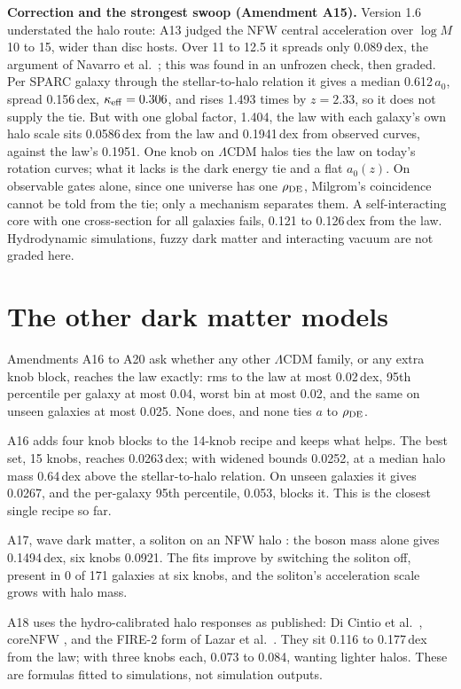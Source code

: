 \documentclass[11pt]{article}
\begin{document}
\textbf{Correction and the strongest swoop (Amendment A15).} Version 1.6 understated the halo route: A13 judged the NFW central acceleration over $\log M$ 10 to 15, wider than disc hosts. Over 11 to 12.5 it spreads only 0.089\,dex, the argument of Navarro et al.\ \cite{navarro17}; this was found in an unfrozen check, then graded. Per SPARC galaxy through the stellar-to-halo relation it gives a median 0.612\,$a_0$, spread 0.156\,dex, $\kappa_{\rm eff}=0.306$, and rises 1.493 times by $z=2.33$, so it does not supply the tie. But with one global factor, 1.404, the law with each galaxy's own halo scale sits 0.0586\,dex from the law and 0.1941\,dex from observed curves, against the law's 0.1951. One knob on $\Lambda$CDM halos ties the law on today's rotation curves; what it lacks is the dark energy tie and a flat $a_0(z)$. On observable gates alone, since one universe has one $\rho_{\rm DE}$, Milgrom's coincidence cannot be told from the tie; only a mechanism separates them. A self-interacting core with one cross-section for all galaxies \cite{kaplinghat14} fails, 0.121 to 0.126\,dex from the law. Hydrodynamic simulations, fuzzy dark matter and interacting vacuum are not graded here.

\section{The other dark matter models}
Amendments A16 to A20 ask whether any other $\Lambda$CDM family, or any extra knob block, reaches the law exactly: rms to the law at most 0.02\,dex, 95th percentile per galaxy at most 0.04, worst bin at most 0.02, and the same on unseen galaxies at most 0.025. None does, and none ties $a$ to $\rho_{\rm DE}$.

A16 adds four knob blocks to the 14-knob recipe and keeps what helps. The best set, 15 knobs, reaches 0.0263\,dex; with widened bounds 0.0252, at a median halo mass 0.64\,dex above the stellar-to-halo relation. On unseen galaxies it gives 0.0267, and the per-galaxy 95th percentile, 0.053, blocks it. This is the closest single recipe so far.

A17, wave dark matter, a soliton on an NFW halo \cite{schive14}: the boson mass alone gives 0.1494\,dex, six knobs 0.0921. The fits improve by switching the soliton off, present in 0 of 171 galaxies at six knobs, and the soliton's acceleration scale grows with halo mass.

A18 uses the hydro-calibrated halo responses as published: Di Cintio et al.\ \cite{dicintio14}, coreNFW \cite{read16}, and the FIRE-2 form of Lazar et al.\ \cite{lazar20}. They sit 0.116 to 0.177\,dex from the law; with three knobs each, 0.073 to 0.084, wanting lighter halos. These are formulas fitted to simulations, not simulation outputs.
\end{document}
